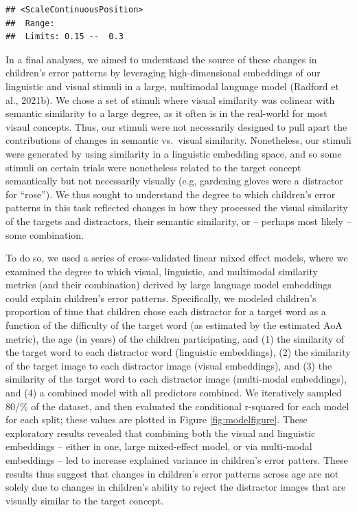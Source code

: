 \documentclass[
  man,mask]{apa6}
\begin{document}
\begin{verbatim}
## <ScaleContinuousPosition>
##  Range:  
##  Limits: 0.15 --  0.3
\end{verbatim}

In a final analyses, we aimed to understand the source of these changes in children's error patterns by leveraging high-dimensional embeddings of our linguistic and visual stimuli in a large, multimodal language model (Radford et al., 2021b). We chose a set of stimuli where visual similarity was colinear with semantic similarity to a large degree, as it often is in the real-world for most visaul concepts. Thus, our stimuli were not necessarily designed to pull apart the contributions of changes in semantic vs.~visual similarity. Nonetheless, our stimuli were generated by using similarity in a linguistic embedding space, and so some stimuli on certain trials were nonetheless related to the target concept semantically but not necessarily visually (e.g, gardening gloves were a distractor for ``rose''). We thus sought to understand the degree to which children's error patterns in this task reflected changes in how they processed the visual similarity of the targets and distractors, their semantic similarity, or -- perhaps most likely -- some combination.

To do so, we used a series of cross-validated linear mixed effect models, where we examined the degree to which visual, linguistic, and multimodal similarity metrics (and their combination) derived by large language model embeddings could explain children's error patterns. Specifically, we modeled children's proportion of time that children chose each distractor for a target word as a function of the difficulty of the target word (as estimated by the estimated AoA metric), the age (in years) of the children participating, and (1) the similarity of the target word to each distractor word (linguistic embeddings), (2) the similarity of the target image to each distractor image (visual embeddings), and (3) the similarity of the target word to each distractor image (multi-modal embeddings), and (4) a combined model with all predictors combined. We iteratively sampled 80/\% of the dataset, and then evaluated the conditional r-squared for each model for each split; these values are plotted in Figure \ref{fig:modelfigure}. These exploratory results revealed that combining both the visual and linguistic embeddings -- either in one, large mixed-effect model, or via multi-modal embeddings -- led to increase explained variance in children's error patters. These results thus suggest that changes in children's error patterns across age are not solely due to changes in children's ability to reject the distractor images that are visually similar to the target concept.
\end{document}
